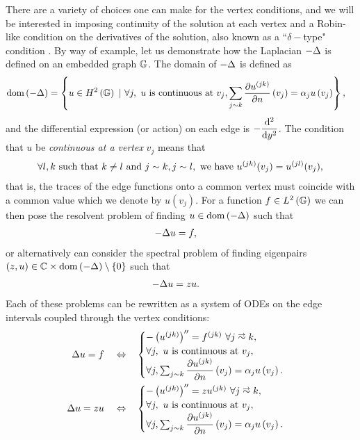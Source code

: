 There are a variety of choices one can make for the vertex conditions, and we will be interested in imposing continuity of the solution at each vertex and a Robin-like condition on the derivatives of the solution, also known as a ``$\delta-$type" condition \cite{berkolaiko2013introduction, albeverio2012solvable}.
By way of example, let us demonstrate how the Laplacian $-\Delta$ is defined on an embedded graph $\mathbb{G}$.
The domain of $-\Delta$ is defined as
\begin{align} \label{eq:GraphLaplacianExample}
	\mathrm{dom}\left( -\Delta \right) &= \left\{  u\in H^2\left( \mathbb{G} \right) \ \vert \ \forall j, \ u \text{ is continuous at } v_j, \sum_{j\sim k}\dfrac{\partial u^{(jk)}}{\partial n}\left( v_j \right) = \alpha_j u\left( v_j \right)  \right\},
\end{align}
and the differential expression (or action) on each edge is $-\dfrac{\mathrm{d}^2 }{\mathrm{d} {y}^2}$.
The condition that $u$ be \emph{continuous at a vertex} $v_j$ means that
\begin{align*}
	\forall l,k \text{ such that } k\neq l \text{ and } j\sim k, j\sim l, \text{ we have } u^{(jk)}(v_j) = u^{(jl)}(v_j),
\end{align*}
that is, the traces of the edge functions onto a common vertex must coincide with a common value which we denote by $u(v_j)$.
For a function $f\in L^2\left( \mathbb{G} \right)$ we can then pose the resolvent problem of finding $u\in\mathrm{dom}\left( -\Delta \right)$ such that
\begin{align*}
	-\Delta u &= f,
\end{align*}
or alternatively can consider the spectral problem of finding eigenpairs $\left( z,u \right)\in\mathbb{C}\times\mathrm{dom}\left( -\Delta \right)\setminus\left\{ 0 \right\}$ such that
\begin{align*}
	-\Delta u &= z u.
\end{align*}
Each of these problems can be rewritten as a system of ODEs on the edge intervals coupled through the vertex conditions:
\begin{subequations} \label{eq:GraphLaplacianIFFs}
	\begin{align}
		\laplacian u = f \quad\Leftrightarrow\quad &
		\begin{cases}
			-\bracs{u^{(jk)}}'' = f^{(jk)} \ \forall j\conLeft k, \\
			\forall j, \ u \text{ is continuous at } v_j, \\
			\forall j, \sum_{j\con k}\pdiff{u^{(jk)}}{n}\bracs{v_j} = \alpha_j u\bracs{v_j}.
		\end{cases} \\
		\laplacian u = z u \quad\Leftrightarrow\quad &
		\begin{cases}
			-\bracs{u^{(jk)}}'' = z u^{(jk)} \ \forall j\conLeft k, \\
			\forall j, \ u \text{ is continuous at } v_j, \\
			\forall j, \sum_{j\con k}\pdiff{u^{(jk)}}{n}\bracs{v_j} = \alpha_j u\bracs{v_j}.
		\end{cases}
	\end{align}
\end{subequations}
